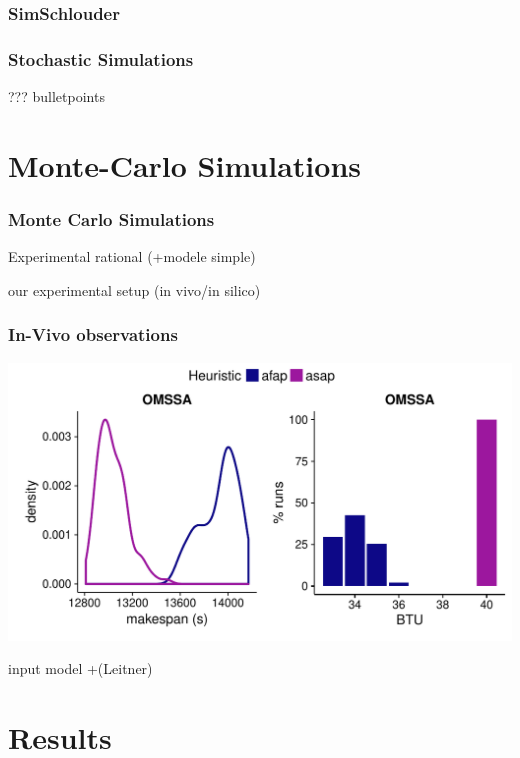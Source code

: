 \documentclass{beamer}
\begin{document}
\begin{frame}
	\frametitle{SimSchlouder}
	\resizebox{\textwidth}{!}{}
\end{frame}

\begin{frame}
	\frametitle{Stochastic Simulations}
	??? bulletpoints
\end{frame}

\section{Monte-Carlo Simulations}

\begin{frame}
	\frametitle{Monte Carlo Simulations}
	\resizebox{\textwidth}{!}{}
\end{frame}

\begin{frame}
	Experimental rational	(+modele simple)
\end{frame}

\begin{frame}
	our experimental setup (in vivo/in silico)
\end{frame}

\begin{frame}
	\frametitle{In-Vivo observations}
	\includegraphics[width=\textwidth]{gfx/real.pdf}
\end{frame}

\begin{frame}
 	input model +(Leitner)
\end{frame}

\section{Results}
\end{document}

